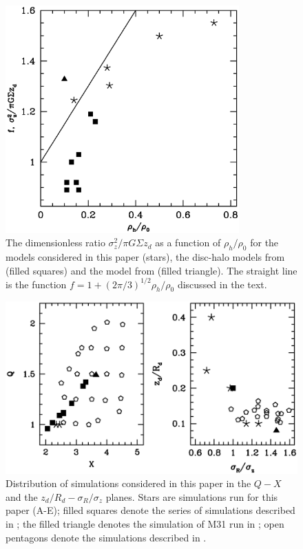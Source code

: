 \begin{figure}
		\centering
        \includegraphics[width=0.8\textwidth]{../figures/falpha.eps}
        \caption{The dimensionless ratio $\sigma_z^2/\pi G\Sigma z_d$ as a
          function of $\rho_h/\rho_0$ for the models considered in
          this paper (stars), the disc-halo models from
          \citet{YurinSpringelStellarDisks} (filled squares) and the
          model from \citet{gauthier2006} (filled triangle).  The
          straight line is the function $f = 1 + \left (2\pi/3\right
          )^{1/2}\rho_h/\rho_0$ discussed in the text.}
\label{fig:falpha}\end{figure}

\begin{figure}
		\centering
        \includegraphics[width=1.\textwidth]{../figures/qxr.eps}
        \caption{Distribution of simulations considered in this paper
          in the $Q-X$ and the $z_d/R_d-\sigma_R/\sigma_z$ planes.
          Stars are simulations run for this paper (A-E); filled
          squares denote the series of simulations described in
          \citet{YurinSpringelStellarDisks}; the filled triangle denotes
          the simulation of M31 run in \citet{gauthier2006}; open
          pentagons denote the simulations described in
          \citet{WPDGalactICSReference}.
        }\label{fig:QXR}\end{figure}


